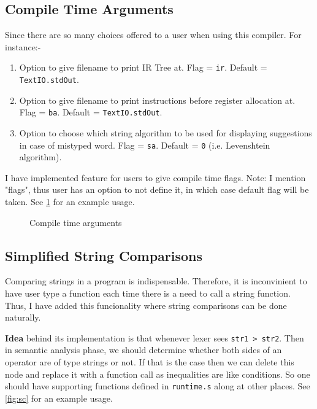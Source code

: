 \subsection{Compile Time Arguments}

Since there are so many choices offered to a user when using this compiler. For instance:-

\begin{enumerate}
  \item Option to give filename to print IR Tree at. Flag = \texttt{ir}. Default = \texttt{TextIO.stdOut}.
  \item Option to give filename to print instructions before register allocation at. Flag = \texttt{ba}. Default = \texttt{TextIO.stdOut}.
  \item Option to choose which string algorithm to be used for displaying suggestions in case of mistyped word. Flag = \texttt{sa}. Default = \texttt{0} (i.e. Levenshtein algorithm).
\end{enumerate}

I have implemented feature for users to give compile time flags. Note: I mention "flags", thus user has an option to not define it, in which case default flag will be taken. See \ref{fig:flags} for an example usage.


\begin{figure}
\centering
{}
\caption{Compile time arguments}
\label{fig:flags}
\end{figure}

\subsection{Simplified String Comparisons}

Comparing strings in  a program is indispensable. Therefore, it is inconvinient to have user type a function each time there is a need to call a string function. Thus, I have added this funcionality where string comparisons can be done naturally. 

\textbf{Idea} behind its implementation is that whenever lexer sees \texttt{str1 > str2}. Then in semantic analysis phase, we should determine whether both sides of an operator are of type strings or not. If that is the case then we can delete this node and replace it with a function call as inequalities are like conditions. So one should have supporting functions defined in \texttt{runtime.s} along at other places. See \ref{fig:sc} for an example usage.

